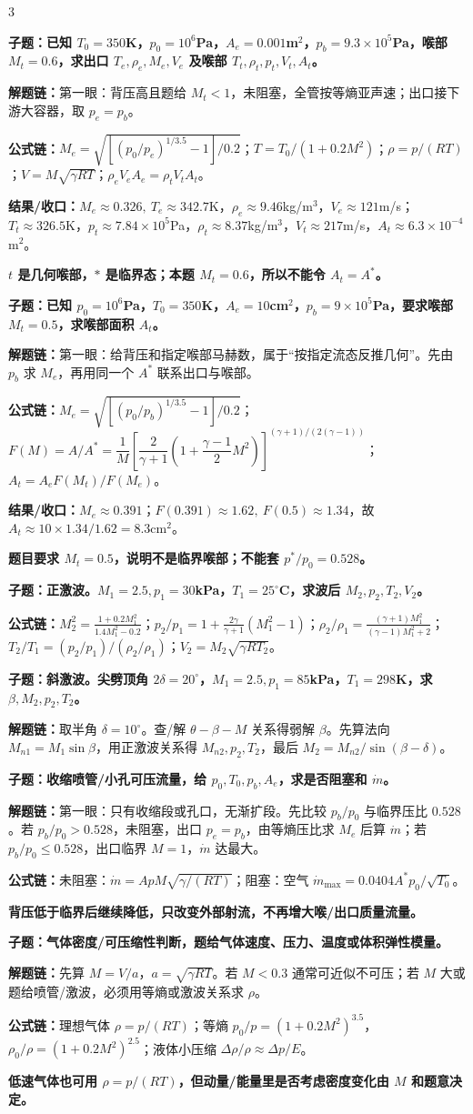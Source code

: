 \documentclass[a4paper]{article}
\newcommand{\qt}[1]{\vspace{0.10pt}\colorbox{Q}{\parbox{\dimexpr\linewidth-2\fboxsep}{\color{white}\bfseries #1}}\par}
\newcommand{\warn}[1]{\colorbox{Y}{\parbox{\dimexpr\linewidth-2\fboxsep}{\color{E}\bfseries #1}}\par}
\newcommand{\chain}[1]{{\color{A}\bfseries 解题链：}#1\par}
\newcommand{\res}[1]{{\color{E}\bfseries 结果/收口：}#1\par}
\newcommand{\form}[1]{{\color{M}\bfseries 公式链：}#1\par}
\begin{document}
\begin{multicols}{3}
\qt{子题：已知 $T_0=350$K，$p_0=10^6$Pa，$A_e=0.001$m$^2$，$p_b=9.3\times10^5$Pa，喉部 $M_t=0.6$，求出口 $T_e,\rho_e,M_e,V_e$ 及喉部 $T_t,\rho_t,p_t,V_t,A_t$。}
\chain{第一眼：背压高且题给 $M_t<1$，未阻塞，全管按等熵亚声速；出口接下游大容器，取 $p_e=p_b$。}
\form{$M_e=\sqrt{[(p_0/p_e)^{1/3.5}-1]/0.2}$；$T=T_0/(1+0.2M^2)$；$\rho=p/(RT)$；$V=M\sqrt{\gamma RT}$；$\rho_eV_eA_e=\rho_tV_tA_t$。}
\res{$M_e\approx0.326,\ T_e\approx342.7$K，$\rho_e\approx9.46$kg/m$^3$，$V_e\approx121$m/s；$T_t\approx326.5$K，$p_t\approx7.84\times10^5$Pa，$\rho_t\approx8.37$kg/m$^3$，$V_t\approx217$m/s，$A_t\approx6.3\times10^{-4}$m$^2$。}
\warn{$t$ 是几何喉部，$*$ 是临界态；本题 $M_t=0.6$，所以不能令 $A_t=A^*$。}

\qt{子题：已知 $p_0=10^6$Pa，$T_0=350$K，$A_e=10$cm$^2$，$p_b=9\times10^5$Pa，要求喉部 $M_t=0.5$，求喉部面积 $A_t$。}
\chain{第一眼：给背压和指定喉部马赫数，属于“按指定流态反推几何”。先由 $p_b$ 求 $M_e$，再用同一个 $A^*$ 联系出口与喉部。}
\form{$M_e=\sqrt{[(p_0/p_b)^{1/3.5}-1]/0.2}$；$F(M)=A/A^*=\dfrac1M\left[\dfrac{2}{\gamma+1}\left(1+\dfrac{\gamma-1}{2}M^2\right)\right]^{(\gamma+1)/(2(\gamma-1))}$；$A_t=A_eF(M_t)/F(M_e)$。}
\res{$M_e\approx0.391$；$F(0.391)\approx1.62,\ F(0.5)\approx1.34$，故 $A_t\approx10\times1.34/1.62=8.3$cm$^2$。}
\warn{题目要求 $M_t=0.5$，说明不是临界喉部；不能套 $p^*/p_0=0.528$。}

\qt{子题：正激波。$M_1=2.5,p_1=30$kPa，$T_1=25^\circ$C，求波后 $M_2,p_2,T_2,V_2$。}
\form{$M_2^2=\frac{1+0.2M_1^2}{1.4M_1^2-0.2}$；$p_2/p_1=1+\frac{2\gamma}{\gamma+1}(M_1^2-1)$；$\rho_2/\rho_1=\frac{(\gamma+1)M_1^2}{(\gamma-1)M_1^2+2}$；$T_2/T_1=(p_2/p_1)/(\rho_2/\rho_1)$；$V_2=M_2\sqrt{\gamma RT_2}$。}

\qt{子题：斜激波。尖劈顶角 $2\delta=20^\circ$，$M_1=2.5,p_1=85$kPa，$T_1=298$K，求 $\beta,M_2,p_2,T_2$。}
\chain{取半角 $\delta=10^\circ$。查/解 $\theta-\beta-M$ 关系得弱解 $\beta$。先算法向 $M_{n1}=M_1\sin\beta$，用正激波关系得 $M_{n2},p_2,T_2$，最后 $M_2=M_{n2}/\sin(\beta-\delta)$。}

\qt{子题：收缩喷管/小孔可压流量，给 $p_0,T_0,p_b,A_e$，求是否阻塞和 $\dot m$。}
\chain{第一眼：只有收缩段或孔口，无渐扩段。先比较 $p_b/p_0$ 与临界压比 $0.528$。若 $p_b/p_0>0.528$，未阻塞，出口 $p_e=p_b$，由等熵压比求 $M_e$ 后算 $\dot m$；若 $p_b/p_0\le0.528$，出口临界 $M=1$，$\dot m$ 达最大。}
\form{未阻塞：$\dot m=A p M\sqrt{\gamma/(RT)}$；阻塞：空气 $\dot m_{\max}=0.0404 A^*p_0/\sqrt{T_0}$。}
\warn{背压低于临界后继续降低，只改变外部射流，不再增大喉/出口质量流量。}

\qt{子题：气体密度/可压缩性判断，题给气体速度、压力、温度或体积弹性模量。}
\chain{先算 $M=V/a$，$a=\sqrt{\gamma RT}$。若 $M<0.3$ 通常可近似不可压；若 $M$ 大或题给喷管/激波，必须用等熵或激波关系求 $\rho$。}
\form{理想气体 $\rho=p/(RT)$；等熵 $p_0/p=(1+0.2M^2)^{3.5}$，$\rho_0/\rho=(1+0.2M^2)^{2.5}$；液体小压缩 $\Delta\rho/\rho\approx\Delta p/E$。}
\warn{低速气体也可用 $\rho=p/(RT)$，但动量/能量里是否考虑密度变化由 $M$ 和题意决定。}


\end{multicols}
\end{document}
